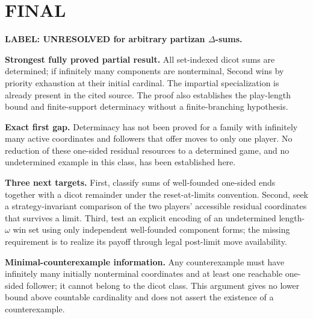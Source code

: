 \documentclass[11pt,a4paper]{article}
\theoremstyle{definition}\newtheorem{definition}[theorem]{Definition}
\theoremstyle{remark}\newtheorem{remark}[theorem]{Remark}
\newcommand{\1}{\mathbf 1}
\begin{document}
\section{FINAL}
\textbf{LABEL: UNRESOLVED for arbitrary partizan $\Delta$-sums.}

\textbf{Strongest fully proved partial result.} All set-indexed dicot sums are determined; if infinitely many components are nonterminal, Second wins by priority exhaustion at their initial cardinal. The impartial specialization is already present in the cited source. The proof also establishes the play-length bound and finite-support determinacy without a finite-branching hypothesis.

\textbf{Exact first gap.} Determinacy has not been proved for a family with infinitely many active coordinates and followers that offer moves to only one player. No reduction of these one-sided residual resources to a determined game, and no undetermined example in this class, has been established here.

\textbf{Three next targets.} First, classify sums of well-founded one-sided ends together with a dicot remainder under the reset-at-limits convention. Second, seek a strategy-invariant comparison of the two players' accessible residual coordinates that survives a limit. Third, test an explicit encoding of an undetermined length-$\omega$ win set using only independent well-founded component forms; the missing requirement is to realize its payoff through legal post-limit move availability.

\textbf{Minimal-counterexample information.} Any counterexample must have infinitely many initially nonterminal coordinates and at least one reachable one-sided follower; it cannot belong to the dicot class. This argument gives no lower bound above countable cardinality and does not assert the existence of a counterexample.
\end{document}
